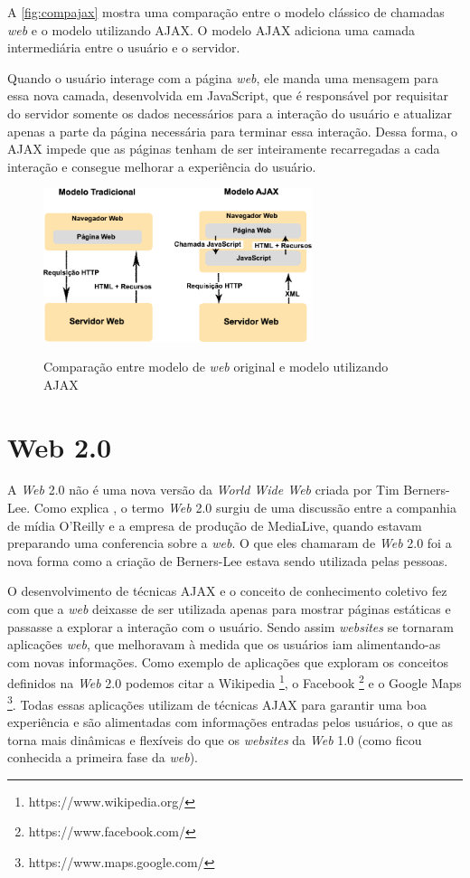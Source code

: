 A \autoref{fig:compajax} mostra uma comparação entre o modelo clássico de chamadas \textit{web} e o modelo utilizando AJAX. O modelo AJAX adiciona uma camada intermediária entre o usuário e o servidor.

Quando o usuário interage com a página \textit{web}, ele manda uma mensagem para essa nova camada, desenvolvida em JavaScript, que é responsável por requisitar do servidor somente os dados necessários para a interação do usuário e atualizar apenas a parte da página necessária para terminar essa interação. Dessa forma, o AJAX impede que as páginas tenham de ser inteiramente recarregadas a cada interação e consegue melhorar a experiência do usuário.

\begin{figure}[!htb]
    \centering
    \caption{Comparação entre modelo de \textit{web} original e modelo utilizando AJAX}
    \includegraphics[width=0.7\textwidth]{./04-figuras/fund-teorica/comparacao_ajax}
    \label{fig:compajax}
\end{figure}


\section{Web 2.0}
\label{sec:web20}
A \textit{Web} 2.0 não é uma nova versão da \textit{World Wide Web} criada por Tim Berners-Lee. Como explica , o termo \textit{Web} 2.0 surgiu de uma discussão entre a companhia de mídia O'Reilly e a empresa de produção de MediaLive, quando estavam preparando uma conferencia sobre a \textit{web}. O que eles chamaram de \textit{Web} 2.0 foi a nova forma como a criação de Berners-Lee estava sendo utilizada pelas pessoas.

O desenvolvimento de técnicas AJAX e o conceito de conhecimento coletivo fez com que a \textit{web} deixasse de ser utilizada apenas para mostrar páginas estáticas e passasse a explorar a interação com o usuário. Sendo assim \textit{websites} se tornaram aplicações \textit{web}, que melhoravam à medida que os usuários iam alimentando-as com novas informações. Como exemplo de aplicações que exploram os conceitos definidos na \textit{Web} 2.0 podemos citar a Wikipedia \footnote{https://www.wikipedia.org/}, o Facebook \footnote{https://www.facebook.com/} e o Google Maps \footnote{https://www.maps.google.com/}. Todas essas aplicações utilizam de técnicas AJAX para garantir uma boa experiência e são alimentadas com informações entradas pelos usuários, o que as torna mais dinâmicas e flexíveis do que os \textit{websites} da \textit{Web} 1.0 (como ficou conhecida a primeira fase da \textit{web}).